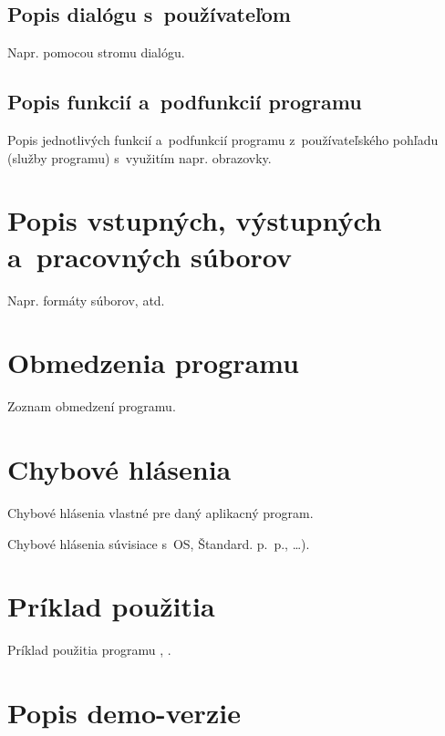 \documentclass[a4paper]{pouzivatelskaPrirucka}
\begin{document}
\subsection{Popis dialógu s~používateľom}

Napr. pomocou stromu dialógu.

\subsection{Popis funkcií a~podfunkcií programu}

Popis jednotlivých funkcií a~podfunkcií programu z~používateľského pohľadu (služby programu) s~využitím napr.  obrazovky.

\newpage\section{Popis vstupných, výstupných a~pracovných súborov}

Napr. formáty súborov, atd.

\newpage\section{Obmedzenia programu}

Zoznam obmedzení programu.

\newpage\section{Chybové hlásenia}

Chybové hlásenia vlastné pre daný aplikacný program.

Chybové hlásenia súvisiace s~OS, Štandard. p.~p., \dots).

\newpage\section{Príklad použitia}

Príklad použitia programu \cite{Sumichrast2013}, \cite{Xie2015}.

\newpage\section{Popis demo-verzie}
\end{document}

